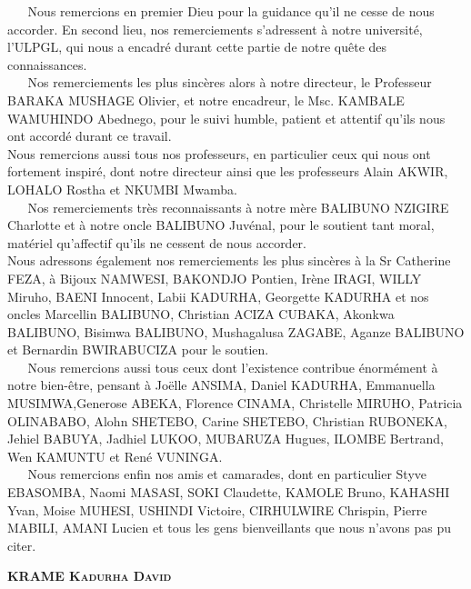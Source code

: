 $ _{} $ $ _{} $ $ _{} $ $ _{} $ $ _{} $Nous remercions en premier Dieu pour la guidance qu'il ne cesse de nous accorder. En second lieu, nos remerciements s'adressent à notre université, l'ULPGL, qui nous a encadré durant cette partie de notre quête des connaissances.\\
$ _{} $ $ _{} $ $ _{} $ $ _{} $ $ _{} $Nos remerciements les plus sincères alors à notre directeur, le Professeur BARAKA MUSHAGE Olivier, et notre encadreur, le Msc. KAMBALE WAMUHINDO Abednego, pour le suivi humble, patient et attentif qu'ils nous ont accordé durant ce travail.\\
Nous remercions aussi tous nos professeurs, en particulier ceux qui nous ont fortement inspiré, dont notre directeur ainsi que les professeurs Alain AKWIR,  LOHALO Rostha et NKUMBI Mwamba.\\
$ _{} $ $ _{} $ $ _{} $ $ _{} $ $ _{} $Nos remerciements très reconnaissants à notre mère BALIBUNO NZIGIRE Charlotte et à notre oncle BALIBUNO Juvénal, pour le soutient tant moral, matériel qu'affectif qu'ils ne cessent de nous accorder.\\
Nous adressons également nos remerciements les plus sincères à la Sr Catherine FEZA, à Bijoux NAMWESI, BAKONDJO Pontien, Irène IRAGI, WILLY Miruho, BAENI Innocent, Labii KADURHA, Georgette KADURHA et nos oncles Marcellin BALIBUNO, Christian ACIZA CUBAKA, Akonkwa BALIBUNO, Bisimwa BALIBUNO, Mushagalusa ZAGABE, Aganze BALIBUNO et Bernardin BWIRABUCIZA pour le soutien.\\
$ _{} $ $ _{} $ $ _{} $ $ _{} $ $ _{} $Nous remercions aussi tous ceux dont l'existence contribue énormément à notre bien-être, pensant à Joëlle ANSIMA, Daniel KADURHA, Emmanuella MUSIMWA,Generose ABEKA, Florence CINAMA, Christelle MIRUHO, Patricia OLINABABO, Alohn SHETEBO, Carine SHETEBO, Christian RUBONEKA, Jehiel BABUYA, Jadhiel LUKOO, MUBARUZA Hugues, ILOMBE Bertrand, Wen KAMUNTU et René VUNINGA.\\
$ _{} $ $ _{} $ $ _{} $ $ _{} $ $ _{} $Nous remercions enfin nos amis et camarades, dont en particulier Styve EBASOMBA, Naomi MASASI, SOKI Claudette, KAMOLE Bruno, KAHASHI Yvan, Moise MUHESI, USHINDI Victoire, CIRHULWIRE Chrispin, Pierre MABILI, AMANI Lucien et tous les gens bienveillants que nous n'avons pas pu citer.
\begin{flushright}
\textbf{\textsc{KRAME Kadurha David}}
\end{flushright}
